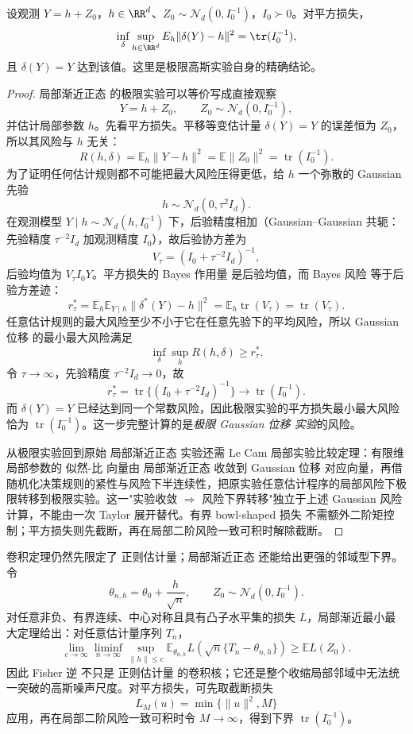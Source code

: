 \begin{theorem}[高斯位移实验的平方损失极小极大风险]
设观测 $Y=h+Z_0$，$h\in\RR^d$、$Z_0\sim\mathcal N_d(0,I_0^{-1})$，$I_0\succ0$。对平方损失，
\[
\inf_\delta\sup_{h\in\RR^d}E_h\|\delta(Y)-h\|^2=\tr(I_0^{-1}),
\]
且 $\delta(Y)=Y$ 达到该值。这里是极限高斯实验自身的精确结论。
\end{theorem}
\begin{proof}
局部渐近正态 的极限实验可以等价写成直接观察
\[
 Y=h+Z_0,
 \qquad
 Z_0\sim\mathcal N_d(0,I_0^{-1}),
\]
并估计局部参数 $h$。先看平方损失。平移等变估计量 $\delta(Y)=Y$ 的误差恒为 $Z_0$，所以其风险与 $h$ 无关：
\[
 R(h,\delta)
 =\mathbb E_h\|Y-h\|^2
 =\mathbb E\|Z_0\|^2
 =\operatorname{tr}(I_0^{-1}).
\]
为了证明任何估计规则都不可能把最大风险压得更低，给 $h$ 一个弥散的 Gaussian 先验
\[
 h\sim\mathcal N_d(0,\tau^2I_d).
\]
在观测模型 $Y\mid h\sim\mathcal N_d(h,I_0^{-1})$ 下，后验精度相加（Gaussian--Gaussian 共轭：先验精度 $\tau^{-2}I_d$ 加观测精度 $I_0$），故后验协方差为
\[
 V_\tau
 =(I_0+\tau^{-2}I_d)^{-1},
\]
后验均值为 $V_\tau I_0 Y$。平方损失的 Bayes 作用量 是后验均值，而 Bayes 风险 等于后验方差迹：
\[
 r_\tau^*
 =\mathbb E_h\mathbb E_{Y\mid h}\|\delta^*(Y)-h\|^2
 =\mathbb E_h\operatorname{tr}(V_\tau)
 =\operatorname{tr}(V_\tau).
\]
任意估计规则的最大风险至少不小于它在任意先验下的平均风险，所以 Gaussian 位移 的最小最大风险满足
\[
 \inf_\delta\sup_hR(h,\delta)
 \ge r_\tau^*.
\]
令 $\tau\to\infty$，先验精度 $\tau^{-2}I_d\to0$，故
\[
 r_\tau^*=\operatorname{tr}\{(I_0+\tau^{-2}I_d)^{-1}\}\to\operatorname{tr}(I_0^{-1}).
\]
而 $\delta(Y)=Y$ 已经达到同一个常数风险，因此极限实验的平方损失最小最大风险恰为 $\operatorname{tr}(I_0^{-1})$。这一步完整计算的是\emph{极限 Gaussian 位移 实验}的风险。

从极限实验回到原始 局部渐近正态 实验还需 Le Cam 局部实验比较定理：有限维局部参数的 似然-比 向量由 局部渐近正态 收敛到 Gaussian 位移 对应向量，再借随机化决策规则的紧性与风险下半连续性，把原实验任意估计程序的局部风险下极限转移到极限实验。这一"实验收敛 $\Rightarrow$ 风险下界转移"独立于上述 Gaussian 风险计算，不能由一次 Taylor 展开替代。有界 bowl-shaped 损失 不需额外二阶矩控制；平方损失则先截断，再在局部二阶风险一致可积时解除截断。
\end{proof}


\begin{theorem}[局部渐近极小极大界]
卷积定理仍然先限定了 正则估计量；局部渐近正态 还能给出更强的邻域型下界。令
\[
 \theta_{n,h}=\theta_0+\frac{h}{\sqrt n},
 \qquad
 Z_0\sim\mathcal N_d(0,I_0^{-1}).
\]
对任意非负、有界连续、中心对称且具有凸子水平集的损失 $L$，局部渐近最小最大定理给出：对任意估计量序列 $T_n$，
\begin{equation}\label{eq:math-stat-local-asymptotic-minimax}
 \lim_{c\to\infty}\liminf_{n\to\infty}
 \sup_{\|h\|\le c}
 \mathbb E_{\theta_{n,h}}
 L\!\left(\sqrt n\{T_n-\theta_{n,h}\}\right)
 \ge \mathbb E L(Z_0).
\end{equation}
因此 Fisher 逆 不只是 正则估计量 的卷积核；它还是整个收缩局部邻域中无法统一突破的高斯噪声尺度。对平方损失，可先取截断损失
\[
 L_M(u)=\min\{\|u\|^2,M\}
\]
应用，再在局部二阶风险一致可积时令 $M\to\infty$，得到下界 $\operatorname{tr}(I_0^{-1})$。
\end{theorem}

